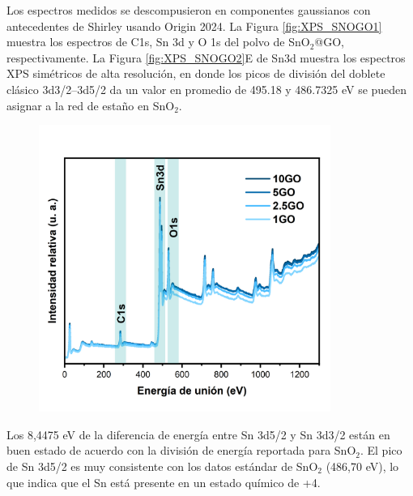 \documentclass[12pt]{article}
\begin{document}
Los espectros medidos se descompusieron en componentes gaussianos con antecedentes de Shirley usando Origin 2024. La Figura \ref{fig:XPS_SNOGO1} muestra los espectros de C1s, Sn 3d y O 1s del polvo de SnO$\displaystyle _{2}$@GO, respectivamente. La Figura \ref{fig:XPS_SNOGO2}E de Sn3d muestra los espectros XPS simétricos de alta resolución, en donde los picos de división del doblete clásico 3d3/2–3d5/2 da un valor en promedio de 495.18 y 486.7325 eV se pueden asignar a la red de estaño en SnO$\displaystyle _{2}$.\vspace{1em} %


\begin{figure}[H]
    	   \begin{center}
     	  	\includegraphics[width = 0.85\textwidth]{Imagenes/XPS_SNOGO1.png}
    	   \end{center} 
        \end{figure}

Los 8,4475 eV de la diferencia de energía entre Sn 3d5/2 y Sn 3d3/2 están en buen estado de acuerdo con la división de energía reportada para SnO$\displaystyle _{2}$. El pico de Sn 3d5/2 es muy consistente con los datos estándar de SnO$\displaystyle _{2}$ (486,70 eV), lo que indica que el Sn está presente en un estado químico de +4. \vspace{1em} %
\end{document}
